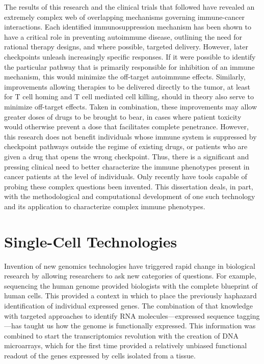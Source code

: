 The results of this research and the clinical trials that followed have revealed an extremely complex web of overlapping mechanisms governing immune-cancer interactions. 
Each identified immunosuppression mechanism has been shown to have a critical role in preventing autoimmune disease, outlining the need for rational therapy designs, and where possible, targeted delivery. 
However, later checkpoints unleash increasingly specific responses. 
If it were possible to identify the particular pathway that is primarily responsible for inhibition of an immune mechanism, this would minimize the off-target autoimmune effects. 
Similarly, improvements allowing therapies to be delivered directly to the tumor, at least for T cell homing and T cell mediated cell killing, should in theory also serve to minimize off-target effects. 
Taken in combination, these improvements may allow greater doses of drugs to be brought to bear, in cases where patient toxicity would otherwise prevent a dose that facilitates complete penetrance. 
However, this research does not benefit individuals whose immune system is suppressed by checkpoint pathways outside the regime of existing drugs, or patients who are given a drug that opens the wrong checkpoint. 
Thus, there is a significant and pressing clinical need to better characterize the immune phenotypes present in cancer patients at the level of individuals. 
Only recently have tools capable of probing these complex questions been invented.
This dissertation deals, in part, with the methodological and computational development of one such technology and its application to characterize complex immune phenotypes. 

\section{Single-Cell Technologies}

Invention of new genomics technologies have triggered rapid change in biological research by allowing researchers to ask new categories of questions. 
For example, sequencing the human genome provided biologists with the complete blueprint of human cells. 
This provided a context in which to place the previously haphazard identification of individual expressed genes. 
The combination of that knowledge with targeted approaches to identify RNA molecules---expressed sequence tagging---has taught us how the genome is functionally expressed. 
This information was combined to start the transcriptomics revolution with the creation of DNA microarrays, which for the first time provided a relatively unbiased functional readout of the genes expressed by cells isolated from a tissue. %


